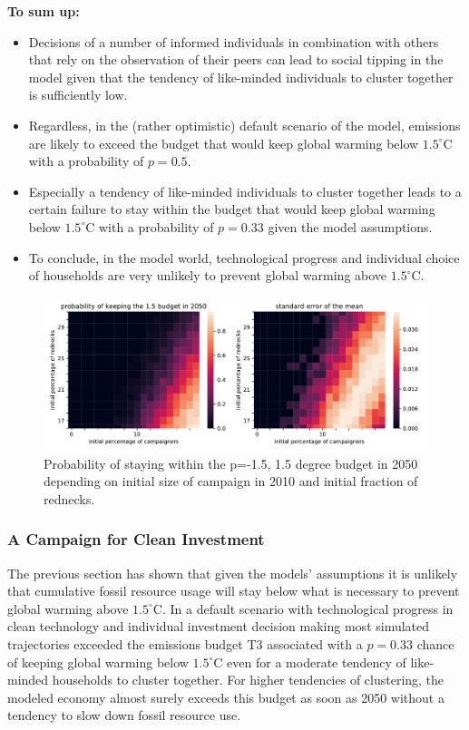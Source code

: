 \textbf{To sum up:}
\begin{itemize}
  \item Decisions of a number of informed individuals in combination with others that rely on the observation of their peers can lead to social tipping in the model given that the tendency of like-minded individuals to cluster together is sufficiently low.
  \item Regardless, in the (rather optimistic) default scenario of the model, emissions are likely to exceed the budget that would keep global warming below $1.5^{\circ}$C with a probability of $p=0.5$.
  \item Especially a tendency of like-minded individuals to cluster together leads to a certain failure to stay within the budget that would keep global warming below $1.5^{\circ}$C with a probability of $p=0.33$ given the model assumptions.
  \item To conclude, in the model world, technological progress and individual choice of households are very unlikely to prevent global warming above $1.5^{\circ}$C.
\end{itemize}



\begin{figure}[t]
    \centering
\includegraphics[width = \textwidth]{figures/p_budget15p50_in2050.pdf}
\caption[Probability of staying within the p=0.5, 1,5 degree budget in 2050 depending on the initial size of a campaign in 2010]{Probability of staying within the p=-1.5, 1.5 degree budget in 2050 depending on initial size of campaign in 2010 and initial fraction of rednecks.}
    \label{fig:p15in2050}
\end{figure}

\subsubsection{A Campaign for Clean Investment}
\label{sec:campaign}
The previous section has shown that given the models' assumptions it is unlikely that cumulative fossil resource usage will stay below what is necessary to prevent global warming above $1.5^{\circ}$C. In a default scenario with technological progress in clean technology and individual investment decision making most simulated trajectories exceeded the emissions budget T3 associated with a $p=0.33$ chance of keeping global warming below $1.5^{\circ}$C even for a moderate tendency of like-minded households to cluster together. For higher tendencies of clustering, the modeled economy almost surely exceeds this budget as soon as 2050 without a tendency to slow down fossil resource use.\\

